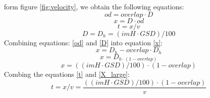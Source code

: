 form figure \ref{fig:velocity}, we obtain the following equations:
\begin{equation}
od =overlap\cdot D
\label{od}
\end{equation}
\begin{equation}
x=D\cdot od
\label{x}
\end{equation}
\begin{equation}
t = x/v
\label{t}
\end{equation}
\begin{equation}
D=D_{h}=(imH\cdot GSD)/100
\label{D}
\end{equation}
Combining equations: \ref{od} and \ref{D} into equation \ref{x}:
\begin{equation}
x = D_{h}-overlap\cdot D_{h}
\end{equation}
\begin{equation}
x= D_{h\cdot (1-overlap)}
\end{equation}
\begin{equation}
x = ((imH\cdot GSD)/100)\cdot (1-overlap)
\label{X_large}
\end{equation}
Combing the equations \ref{t} and \ref{X_large}:
\begin{equation}
t=x/v=\frac{((imH\cdot GSD)/100)\cdot (1-overlap)}{v}
\end{equation}

